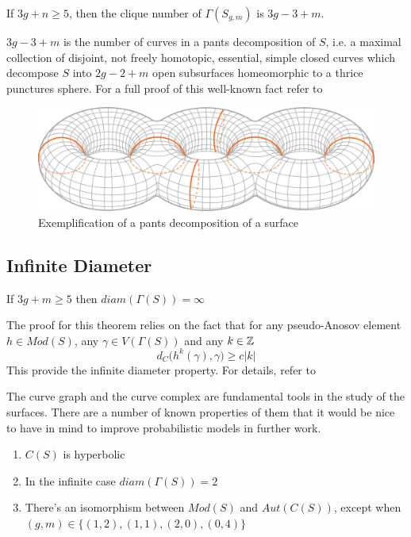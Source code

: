 \begin{theorem}
If $3g+n\geq 5$, then the clique number of $\Gamma(S_{g,m})$ is $3g - 3 + m$.
\end{theorem}

$3g-3+m$ is the number of curves in a pants decomposition of $S$, i.e. a maximal collection of disjoint, not freely homotopic, essential, simple closed curves which decompose $S$ into $2g-2+m$ open subsurfaces homeomorphic to a thrice punctures sphere. For a full proof of this well-known fact refer to \cite[Hatcher, Thurston 80]{Pants}

\vspace{0.5cm}
\begin{figure}[h!]
	\centering
	\includegraphics[scale=0.4]{Figures/Pantalones.png}
	\caption{Exemplification of a pants decomposition of a surface}
\end{figure}

\subsection{Infinite Diameter}
\begin{theorem}
If $3g+m\geq 5$ then $diam(\Gamma(S)) = \infty$
\end{theorem}

The proof for this theorem relies on the fact that for any pseudo-Anosov element $h \in Mod(S)$, any $\gamma \in V(\Gamma(S))$ and any $k\in \mathbb{Z}$
$$d_{C}\Big(h^{k}(\gamma), \gamma\Big) \geq c|k|$$
This provide the infinite diameter property. For details, refer to \cite[Masur, Minsky 99]{Masur}

The curve graph and the curve complex are fundamental tools in the study of the surfaces. There are a number of known properties of them that it would be nice to have in mind to improve probabilistic models in further work.

\begin{enumerate}
\item $C(S)$ is hyperbolic
\item In the infinite case $diam(\Gamma(S))= 2$
\item There's an isomorphism between $Mod(S)$ and $Aut(C(S))$, except when $(g,m) \in \{(1,2), (1,1), (2,0), (0,4)\}$
\end{enumerate}

